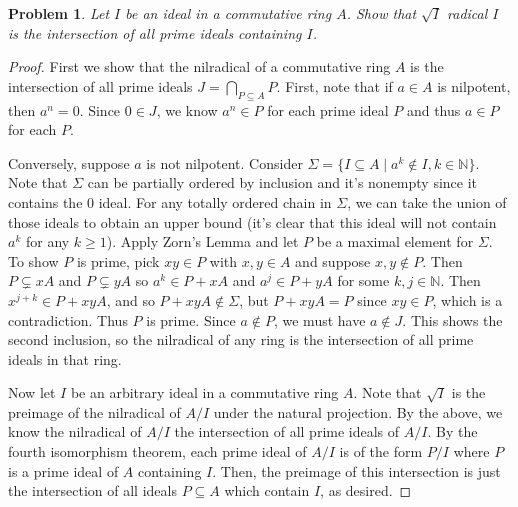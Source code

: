 \documentclass{article}
\newtheorem{problem}{Problem}
\begin{document}
\begin{problem}
Let $I$ be an ideal in a commutative ring $A$. Show that $\sqrt{I}$ radical $I$ is the intersection of all prime ideals containing $I$.
\end{problem}
\begin{proof}
First we show that the nilradical of a commutative ring $A$ is the intersection of all prime ideals $J = \bigcap_{P \subseteq A} P$. First, note that if $a \in A$ is nilpotent, then $a^n = 0$. Since $0 \in J$, we know $a^n \in P$ for each prime ideal $P$ and thus $a \in P$ for each $P$.

Conversely, suppose $a$ is not nilpotent. Consider $\Sigma = \{I \subseteq A \mid a^k \notin I, k \in \mathbb{N}\}$. Note that $\Sigma$ can be partially ordered by inclusion and it's nonempty since it contains the $0$ ideal. For any totally ordered chain in $\Sigma$, we can take the union of those ideals to obtain an upper bound (it's clear that this ideal will not contain $a^k$ for any $k \geq 1$). Apply Zorn's Lemma and let $P$ be a maximal element for $\Sigma$. To show $P$ is prime, pick $xy \in P$ with $x,y \in A$ and suppose $x,y \notin P$. Then $P \subsetneq xA$ and $P \subsetneq yA$ so $a^k \in P + xA$ and $a^j \in P + yA$ for some $k, j \in \mathbb{N}$. Then $x^{j+k} \in P + xyA$, and so $P + xyA \notin \Sigma$, but $P + xyA = P$ since $xy \in P$, which is a contradiction. Thus $P$ is prime. Since $a \notin P$, we must have $a \notin J$. This shows the second inclusion, so the nilradical of any ring is the intersection of all prime ideals in that ring.

Now let $I$ be an arbitrary ideal in a commutative ring $A$. Note that $\sqrt{I}$ is the preimage of the nilradical of $A/I$ under the natural projection. By the above, we know the nilradical of $A/I$ the intersection of all prime ideals of $A/I$. By the fourth isomorphism theorem, each prime ideal of $A/I$ is of the form $P/I$ where $P$ is a prime ideal of $A$ containing $I$. Then, the preimage of this intersection is just the intersection of all ideals $P \subseteq A$ which contain $I$, as desired.
\end{proof}
\end{document}
